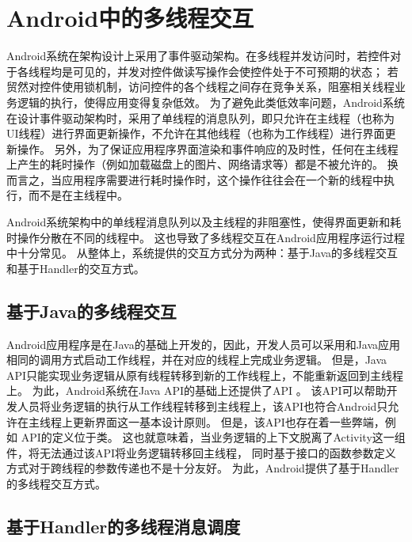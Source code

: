 

\section{Android中的多线程交互}
Android系统在架构设计上采用了事件驱动架构。在多线程并发访问时，若控件对于各线程均是可见的，并发对控件做读写操作会使控件处于不可预期的状态；
若贸然对控件使用锁机制，访问控件的各个线程之间存在竞争关系，阻塞相关线程业务逻辑的执行，使得应用变得复杂低效。
为了避免此类低效率问题，Android系统在设计事件驱动架构时，采用了单线程的消息队列，即只允许在主线程（也称为UI线程）进行界面更新操作，不允许在其他线程（也称为工作线程）进行界面更新操作。
另外，为了保证应用程序界面渲染和事件响应的及时性，任何在主线程上产生的耗时操作（例如加载磁盘上的图片、网络请求等）都是不被允许的。
换而言之，当应用程序需要进行耗时操作时，这个操作往往会在一个新的线程中执行，而不是在主线程中。


Android系统架构中的单线程消息队列以及主线程的非阻塞性，使得界面更新和耗时操作分散在不同的线程中。
这也导致了多线程交互在Android应用程序运行过程中十分常见。
从整体上，系统提供的交互方式分为两种：基于Java的多线程交互和基于Handler的交互方式。%

\subsection{基于Java的多线程交互}

Android应用程序是在Java的基础上开发的，因此，开发人员可以采用和Java应用相同的调用方式启动工作线程，并在对应的线程上完成业务逻辑。
但是，Java API只能实现业务逻辑从原有线程转移到新的工作线程上，不能重新返回到主线程上。
为此，Android系统在Java API的基础上还提供了API 。
该API可以帮助开发人员将业务逻辑的执行从工作线程转移到主线程上，该API也符合Android只允许在主线程上更新界面这一基本设计原则。
但是，该API也存在着一些弊端，例如 API的定义位于类。
这也就意味着，当业务逻辑的上下文脱离了Activity这一组件，将无法通过该API将业务逻辑转移回主线程，
同时基于接口的函数参数定义方式对于跨线程的参数传递也不是十分友好。
为此，Android提供了基于Handler的多线程交互方式。

\subsection{基于Handler的多线程消息调度}


